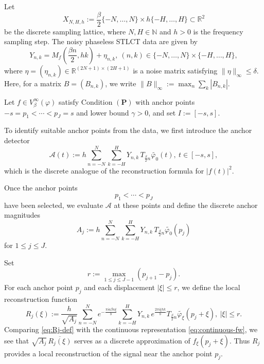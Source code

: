 \documentclass[11pt, reqno]{amsart}
\newcommand{\N}{\mathbb{N}}
\newcommand{\R}{\mathbb{R}}
\numberwithin{equation}{section}
\begin{document}
Let 
$$X_{N,H,h}:=\frac{\beta}{2}\{-N,\dots,N\}\times h\{-H,\dots,H\}\subset\R^2$$ 
be the discrete sampling lattice, where $N, H\in \N$ and $h>0$ is the frequency sampling step.  
The noisy phaseless STLCT data are given by
\begin{equation}\label{noisy.data.def}
Y_{n,k} = M_f\!\left(\frac{\beta n}{2},hk\right)+\eta_{n,k},  \ (n,k)\in\{-N,\dots,N\}\times\{-H,\dots,H\},
\end{equation}
where $\eta=(\eta_{n,k})\in\R^{(2N+1)\times(2H+1)}$ is a noise matrix satisfying
$ \|\eta\|_\infty\le \delta$. 
Here, for a matrix $B=(B_{n,k})$, we write $ \|B\|_\infty:=\max_n\sum_k |B_{n,k}|$.

Let $f\in V_\beta^\infty(\varphi)$ satisfy Condition $(\mathbf P)$ with anchor points
$ -s=p_1<\cdots<p_J=s$   and lower bound $\gamma>0$, and set $I:=[-s,s]$.

To identify suitable anchor points from the data, we first introduce the anchor detector
\begin{equation}\label{eq:anchor-detector}
\mathcal A(t) := h\sum_{n=-N}^{N}\sum_{k=-H}^{H} Y_{n,k}\,T_{\frac{\beta}{2}n}\widetilde{\varphi_0}(t), \ t\in[-s,s], 
\end{equation}
which is the discrete analogue of the reconstruction formula for $|f(t)|^2$.

Once the anchor points
$$p_1<\cdots<p_J$$
have been selected, we evaluate $\mathcal A$ at these points and define the discrete anchor magnitudes
\begin{equation}\label{eq:Aj-def}
A_j := h\sum_{n=-N}^{N}\sum_{k=-H}^{H}Y_{n,k}\,T_{\frac{\beta}{2}n}\widetilde{\varphi_0}(p_j)
\end{equation}
for $1\le j\le J$.

Set  $$r:=\max_{1\le j\le J-1}(p_{j+1}-p_j).$$  
For each anchor point $p_j$ and each displacement $|\xi|\le r$, we define the local reconstruction function
\begin{equation}\label{eq:Rj-def}
R_j(\xi) := \frac{h}{\sqrt{A_j}} \sum_{n=-N}^{N} e^{-\frac{\pi ia\beta n\xi}{b}}
\sum_{k=-H}^{H}Y_{n,k}\,e^{\frac{2\pi i\xi hk}{b}}T_{\frac{\beta}{2}n}\widetilde{\varphi_\xi}(p_j+\xi), \  |\xi|\le r.\end{equation} 
Comparing \eqref{eq:Rj-def} with the continuous representation \eqref{eq:continuous-fw}, we see that $\sqrt{A_j}\,\overline{R_j(\xi)}$
serves as a discrete approximation of $f_\xi(p_j+\xi)$. Thus $R_j$ provides a local reconstruction of the signal near the anchor point $p_j$.
\end{document}
